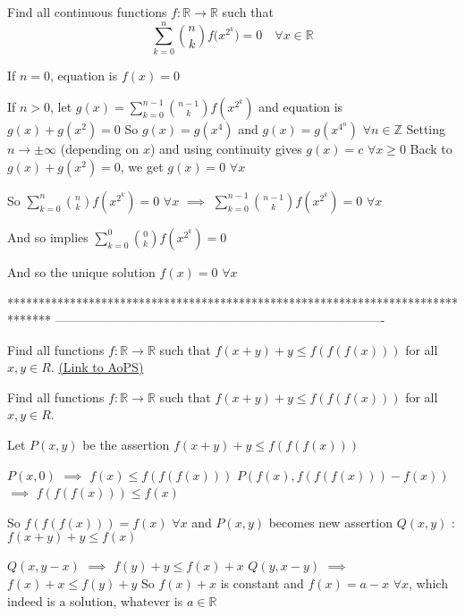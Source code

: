 \begin{solution}
	\begin{tcolorbox}Find all continuous functions $f: \mathbb{R} \to \mathbb{R}$ such that
      \[\sum_{k=0}^{n}{{n\choose k} f(x^{2^{k}}})=0 \quad \forall x\in \mathbb{R} \]\end{tcolorbox}
If $n=0$, equation is $f(x)=0$

If $n>0$, let $g(x)=\sum_{k=0}^{n-1}\binom{n-1}kf(x^{2^k})$ and equation is $g(x)+g(x^2)=0$
So $g(x)=g(x^4)$ and $g(x)=g(x^{4^n})$ $\forall n\in\mathbb Z$
Setting $n\to \pm\infty$ (depending on $x$) and using continuity gives $g(x)=c$ $\forall x\ge 0$
Back to $g(x)+g(x^2)=0$, we get $g(x)=0$ $\forall x$

So $\sum_{k=0}^{n}\binom{n}kf(x^{2^k})=0$ $\forall x$ $\implies$ $\sum_{k=0}^{n-1}\binom{n-1}kf(x^{2^k})=0$ $\forall x$

And so implies $\sum_{k=0}^{0}\binom{0}kf(x^{2^k})=0$

And so the unique solution $\boxed{f(x)=0}$ $\forall x$
\end{solution}
*******************************************************************************
-------------------------------------------------------------------------------

\begin{problem}
	Find all functions $f: \mathbb{R}\to\mathbb{R}$ such that $f(x+y)+y{\leq}f(f(f(x)))$ for all $x,y{\in}R$.
	\flushright \href{https://artofproblemsolving.com/community/c6h565299}{(Link to AoPS)}
\end{problem}



\begin{solution}
	\begin{tcolorbox}Find all functions $f: \mathbb{R}\to\mathbb{R}$ such that $f(x+y)+y{\leq}f(f(f(x)))$ for all $x,y{\in}R$.\end{tcolorbox}
Let $P(x,y)$ be the assertion $f(x+y)+y\le f(f(f(x)))$

$P(x,0)$ $\implies$ $f(x)\le f(f(f(x)))$
$P(f(x),f(f(f(x)))-f(x))$ $\implies$ $f(f(f(x)))\le f(x)$

So $f(f(f(x)))=f(x)$ $\forall x$ and $P(x,y)$ becomes new assertion $Q(x,y)$ : $f(x+y)+y\le f(x)$

$Q(x,y-x)$ $\implies$  $f(y)+y\le f(x)+x$
$Q(y,x-y)$ $\implies$  $f(x)+x\le f(y)+y$
So $f(x)+x$ is constant and $\boxed{f(x)=a-x}$ $\forall x$, which indeed is a solution, whatever is $a\in\mathbb R$
\end{solution}



